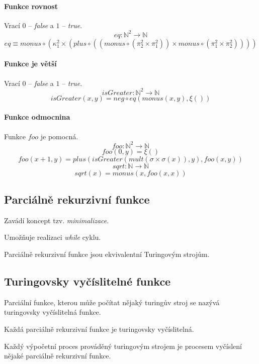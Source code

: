\paragraph*{Funkce rovnost} Vrací $0$ -- \textit{false} a $1$ -- \textit{true}.
$$ eq : \mathbb{N}^2 \rightarrow \mathbb{N} $$
$$ eq \equiv monus \circ ( \kappa_1^2 \times ( plus \circ ((monus \circ (\pi_2^2 \times \pi_1^2)) \times monus \circ (\pi_1^2 \times \pi_2^2 )))) $$

\paragraph*{Funkce je větší} Vrací $0$ -- \textit{false} a $1$ -- \textit{true}.
$$ isGreater : \mathbb{N}^2 \rightarrow \mathbb{N} $$
$$ isGreater(x, y) = neg \circ eq(monus(x, y), \xi()) $$

\paragraph*{Funkce odmocnina} Funkce $foo$ je pomocná.
$$ foo : \mathbb{N}^2 \rightarrow \mathbb{N} $$
$$ foo(0, y) = \xi() $$
$$ foo(x+1, y) = plus (isGreater (mult(\sigma \times \sigma(x)), y), foo(x, y)) $$
$$ sqrt : \mathbb{N} \rightarrow \mathbb{N} $$
$$ sqrt(x) = monus (x,  foo(x, x)) $$

\subsection{Parciálně rekurzivní funkce}

\begin{compactitem}
    \item Zavádí koncept tzv. \textit{minimalizace}.
    \item Umožňuje realizaci \textit{while} cyklu.
    \item Parciálně rekurzivní funkce jsou ekvivalentní Turingovým strojům.
    \item {}
\end{compactitem}

\subsection{Turingovsky vyčíslitelné funkce}

\begin{compactitem}
    \item Parciální funkce, kterou může počítat nějaký turingův stroj se nazývá turingovsky vyčíslitelná funkce.

    \item Každá parciálně rekurzivní funkce je turingovsky vyčíslitelná.

    \item Každý výpočetní proces prováděný turingovým strojem je procesem vyčíslení nějaké parciálně rekurzivní funkce.
\end{compactitem}

